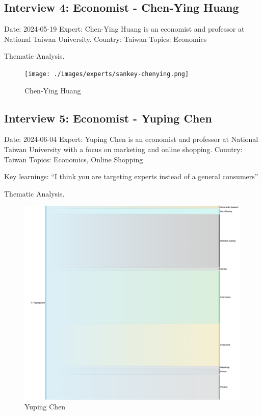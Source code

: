 \documentclass[
  letterpaper,
  DIV=11,
  numbers=noendperiod]{scrartcl}
\begin{document}
\subsection{Interview 4: Economist - Chen-Ying
Huang}\label{interview-4-economist---chen-ying-huang}

Date: 2024-05-19 Expert: Chen-Ying Huang is an economist and professor
at National Taiwan University. Country: Taiwan Topics: Economics

Thematic Analysis.

\begin{figure}[H]

{\centering \texttt{[image: ./images/experts/sankey-chenying.png]}

}

\caption{Chen-Ying Huang}

\end{figure}%

\subsection{Interview 5: Economist - Yuping
Chen}\label{interview-5-economist---yuping-chen}

Date: 2024-06-04 Expert: Yuping Chen is an economist and professor at
National Taiwan University with a focus on marketing and online
shopping. Country: Taiwan Topics: Economics, Online Shopping

Key learnings: ``I think you are targeting experts instead of a general
consumers''

Thematic Analysis.

\begin{figure}[H]

{\centering \includegraphics[width=1\linewidth,height=\textheight,keepaspectratio]{./images/experts/sankey-yuping.png}

}

\caption{Yuping Chen}

\end{figure}%
\end{document}
